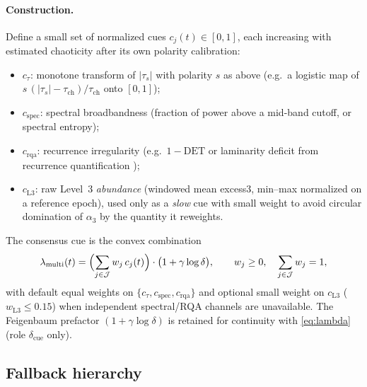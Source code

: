 \documentclass[11pt,a4paper]{article}
\begin{document}
\paragraph{Construction.}
Define a small set of normalized cues $c_j(t)\in[0,1]$, each increasing
with estimated chaoticity after its own polarity calibration:
\begin{itemize}[leftmargin=*,itemsep=2pt]
  \item $c_\tau$: monotone transform of $|\tau_s|$ with polarity $s$ as
  above (e.g.\ a logistic map of
  $s\,(|\tau_s|-\tau_{\mathrm{ch}})/\tau_{\mathrm{ch}}$ onto $[0,1]$);
  \item $c_{\mathrm{spec}}$: spectral broadbandness (fraction of power
  above a mid-band cutoff, or spectral entropy);
  \item $c_{\mathrm{rqa}}$: recurrence irregularity (e.g.\ $1-\mathrm{DET}$
  or laminarity deficit from recurrence quantification
  \cite{Marwan2007});
  \item $c_{\mathrm{L3}}$: raw Level~3 \emph{abundance} (windowed mean
  excess3, min--max normalized on a reference epoch), used only as a
  \emph{slow} cue with small weight to avoid circular domination of
  $\alpha_3$ by the quantity it reweights.
\end{itemize}
The consensus cue is the convex combination
\begin{equation}
\label{eq:lambda-multi}
\lambda_{\mathrm{multi}}(t)
=
\Bigl(\sum_{j\in\mathcal{J}} w_j\,c_j(t)\Bigr)
\cdot
\bigl(1+\gamma\log\delta\bigr),
\qquad
w_j\geq 0,\quad
\sum_{j\in\mathcal{J}} w_j=1,
\end{equation}
with default equal weights on $\{c_\tau,c_{\mathrm{spec}},c_{\mathrm{rqa}}\}$
and optional small weight on $c_{\mathrm{L3}}$ ($w_{\mathrm{L3}}\leq 0.15$)
when independent spectral/RQA channels are unavailable. The Feigenbaum
prefactor $(1+\gamma\log\delta)$ is retained for continuity with
\eqref{eq:lambda} (role $\delta_{\mathrm{cue}}$ only).

\subsection{Fallback hierarchy}
\end{document}
